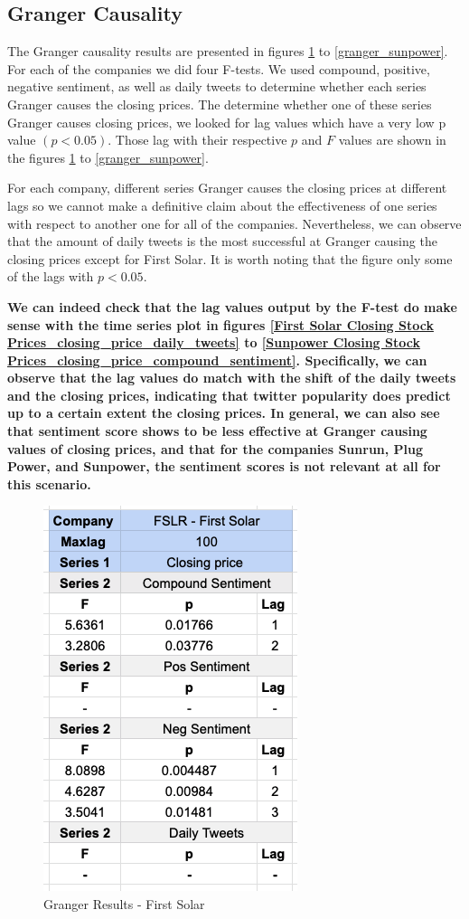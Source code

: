 \documentclass[sigconf, nonacm]{acmart}
\begin{document}
\subsection{Granger Causality} 
The Granger causality results are presented in figures \ref{granger_first_solar} to \ref{granger_sunpower}. For each of the companies we did four F-tests. We used compound, positive, negative sentiment, as well as daily tweets to determine whether each series Granger causes the closing prices. The determine whether one of these series Granger causes closing prices, we looked for lag values which have a very low p value $(p < 0.05)$. Those lag with their respective $p$ and $F$ values are shown in the figures  \ref{granger_first_solar} to \ref{granger_sunpower}. \newline

For each company, different series Granger causes the closing prices at different lags so we cannot make a definitive claim about the effectiveness of one series with respect to another one for all of the companies. Nevertheless, we can observe that the amount of daily tweets is the most successful at Granger causing the closing prices except for First Solar.  It is worth noting that the figure only some of the lags with $p < 0.05$. \newline

\textbf{We can indeed check that the lag values output by the F-test do make sense with the time series plot in figures \ref{First Solar Closing Stock Prices_closing_price_daily_tweets} to \ref{Sunpower Closing Stock Prices_closing_price_compound_sentiment}. Specifically, we can observe that the lag values do match with the shift of the daily tweets and the closing prices, indicating that twitter popularity does predict up to a certain extent the closing prices. In general, we can also see that sentiment score shows to be less effective at Granger causing values of closing prices, and that for the companies Sunrun, Plug Power, and Sunpower, the sentiment scores is not relevant at all for this scenario.}

\begin{figure}[H]
  \centering
  \includegraphics[width=0.4\linewidth]{granger_results/granger_first_solar.png}
  \caption{Granger Results - First Solar}
  \label{granger_first_solar}
\end{figure}
\end{document}
